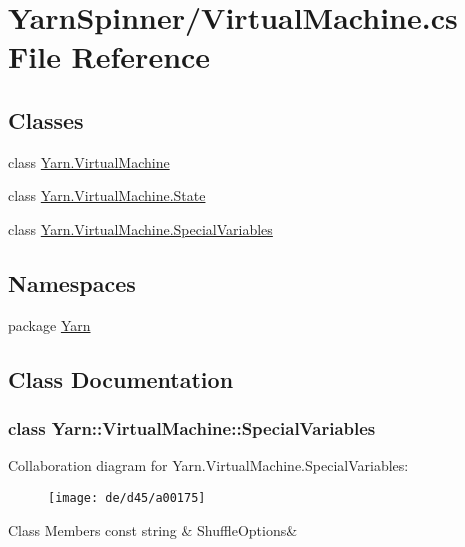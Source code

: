 \hypertarget{a00127}{\section{Yarn\-Spinner/\-Virtual\-Machine.cs File Reference}
\label{a00127}
}
\subsection*{Classes}
\begin{DoxyCompactItemize}
\item 
class \hyperlink{a00072}{Yarn.\-Virtual\-Machine}
\item 
class \hyperlink{a00075}{Yarn.\-Virtual\-Machine.\-State}
\item 
class \hyperlink{a00072_db/ddf/a00164}{Yarn.\-Virtual\-Machine.\-Special\-Variables}
\end{DoxyCompactItemize}
\subsection*{Namespaces}
\begin{DoxyCompactItemize}
\item 
package \hyperlink{a00026}{Yarn}
\end{DoxyCompactItemize}


\subsection{Class Documentation}
\label{db/ddf/a00164}
\hypertarget{a00072_db/ddf/a00164}{}
\subsubsection{class Yarn\-:\-:Virtual\-Machine\-:\-:Special\-Variables}


Collaboration diagram for Yarn.\-Virtual\-Machine.\-Special\-Variables\-:
\nopagebreak
\begin{figure}[H]
\begin{center}
\leavevmode
\texttt{[image: de/d45/a00175]}
\end{center}
\end{figure}
\begin{DoxyFields}{Class Members}
\hypertarget{a00072_aecbb8ab9becd96457d836100b2818078}{const string}\label{a00072_aecbb8ab9becd96457d836100b2818078}
&
Shuffle\-Options&
\\
\hline

\end{DoxyFields}
